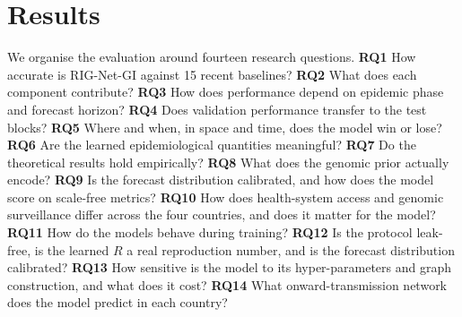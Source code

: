 \documentclass[conference]{IEEEtran}
\begin{document}
\section{Results}\label{sec:results}

We organise the evaluation around fourteen research questions.
\textbf{RQ1} How accurate is RIG-Net-GI against 15 recent baselines?
\textbf{RQ2} What does each component contribute?
\textbf{RQ3} How does performance depend on epidemic phase and forecast horizon?
\textbf{RQ4} Does validation performance transfer to the test blocks?
\textbf{RQ5} Where and when, in space and time, does the model win or lose?
\textbf{RQ6} Are the learned epidemiological quantities meaningful?
\textbf{RQ7} Do the theoretical results hold empirically?
\textbf{RQ8} What does the genomic prior actually encode?
\textbf{RQ9} Is the forecast distribution calibrated, and how does the model score on scale-free metrics?
\textbf{RQ10} How does health-system access and genomic surveillance differ across the four countries, and does it matter for the model?
\textbf{RQ11} How do the models behave during training?
\textbf{RQ12} Is the protocol leak-free, is the learned $R$ a real reproduction number, and is the forecast distribution calibrated?
\textbf{RQ13} How sensitive is the model to its hyper-parameters and graph construction, and what does it cost?
\textbf{RQ14} What onward-transmission network does the model predict in each country?
\end{document}
